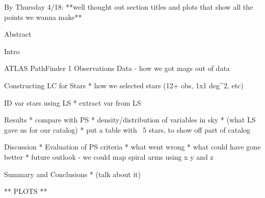 By Thursday 4/18:
**well thought out section titles and plots that show all the points we wanna make**



Abstract

Intro

ATLAS PathFinder 1 Observations
	Data - how we got mags out of data

Constructing LC for Stars
  * how we selected stars (12+ obs, 1x1 deg^2, etc)

ID var stars using LS
 * extract var from LS

Results
  * compare with PS
  * density/distribution of variables in sky
  * (what LS gave us for our catalog)
  * put a table with ~5 stars, to show off part of catalog

Discussion
 * Evaluation of PS criteria
 * what went wrong
 * what could have gone better
 * future outlook
  - we could map spiral arms using x y and z

Summary and Conclusions
 * (talk about it)


** PLOTS **
